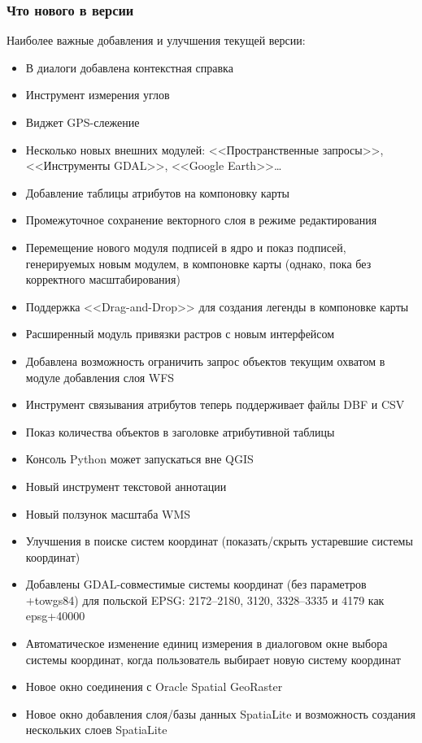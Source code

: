 \subsubsection{Что нового в версии \CURRENT}

Наиболее важные добавления и улучшения текущей версии:
\begin{itemize}[label=--]
 \item В диалоги добавлена контекстная справка
 \item Инструмент измерения углов
 \item Виджет GPS-слежение
 \item Несколько новых внешних модулей: <<Пространственные запросы>>,
 <<Инструменты GDAL>>, <<Google Earth>>\dots
 \item Добавление таблицы атрибутов на компоновку карты
 \item Промежуточное сохранение векторного слоя в режиме редактирования
 \item Перемещение нового модуля подписей в ядро и показ подписей,
 генерируемых новым модулем, в компоновке карты (однако, пока без корректного
 масштабирования)
 \item Поддержка <<Drag-and-Drop>> для создания легенды в
 компоновке карты
 \item Расширенный модуль привязки растров с новым интерфейсом
 \item Добавлена возможность ограничить запрос объектов текущим охватом
 в модуле добавления слоя WFS
 \item Инструмент связывания атрибутов теперь поддерживает файлы DBF
 и CSV
 \item Показ количества объектов в заголовке атрибутивной таблицы
 \item Консоль Python может запускаться вне QGIS
 \item Новый инструмент текстовой аннотации
 \item Новый ползунок масштаба WMS
 \item Улучшения в поиске систем координат (показать/скрыть устаревшие
 системы координат)
 \item Добавлены GDAL-совместимые системы координат (без параметров
 +towgs84) для польской EPSG: 2172--2180, 3120, 3328--3335 и 4179 как
 epsg+40000
 \item Автоматическое изменение единиц измерения в диалоговом окне
 выбора системы координат, когда пользователь выбирает новую систему
 координат
 \item Новое окно соединения с Oracle Spatial GeoRaster
 \item Новое окно добавления слоя/базы данных SpatiaLite и возможность
 создания нескольких слоев SpatiaLite

\end{itemize}
